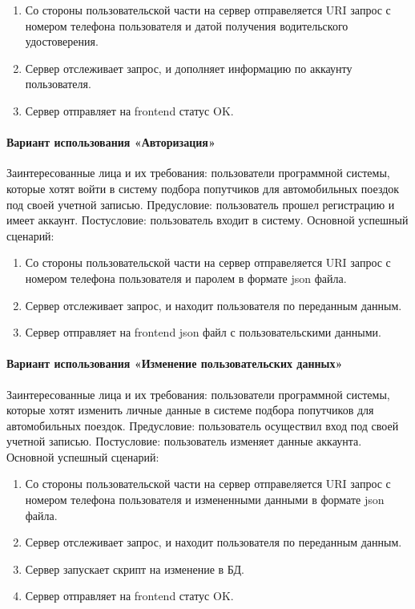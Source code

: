 \begin{enumerate}
	\item Со стороны пользовательской части на сервер отправеляется URI запрос с номером телефона пользователя и датой получения водительского удостоверения.
	\item Сервер отслеживает запрос, и дополняет информацию по аккаунту пользователя.
	\item Сервер отправляет на frontend статус OK.
\end{enumerate}

\paragraph{Вариант использования «Авторизация»}
Заинтересованные лица и их требования: пользователи программной системы, которые хотят войти в систему подбора попутчиков для автомобильных поездок под своей учетной записью. Предусловие: пользователь прошел регистрацию и имеет аккаунт. Постусловие: пользователь входит в систему.
Основной успешный сценарий:

\begin{enumerate}
	\item Со стороны пользовательской части на сервер отправеляется URI запрос с номером телефона пользователя и паролем в формате json файла.
	\item Сервер отслеживает запрос, и находит пользователя по переданным данным.
	\item Сервер отправляет на frontend json файл с пользовательскими данными.
\end{enumerate}

\paragraph{Вариант использования «Изменение пользовательских данных»}
Заинтересованные лица и их требования: пользователи программной системы, которые хотят изменить личные данные в системе подбора попутчиков для автомобильных поездок. Предусловие: пользователь осуществил вход под своей учетной записью. Постусловие: пользователь изменяет данные аккаунта.
Основной успешный сценарий:

\begin{enumerate}
	\item Со стороны пользовательской части на сервер отправеляется URI запрос с номером телефона пользователя и измененными данными в формате json файла.
	\item Сервер отслеживает запрос, и находит пользователя по переданным данным.
	\item Сервер запускает скрипт на изменение в БД.
	\item Сервер отправляет на frontend статус OK.
\end{enumerate}

